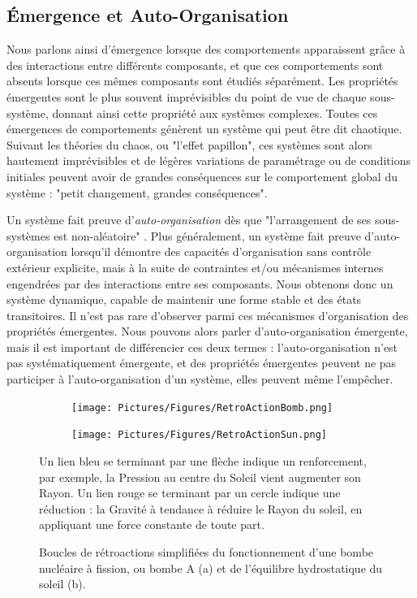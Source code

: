 			\subsection{Émergence et Auto-Organisation}
			
			Nous parlons ainsi d'émergence lorsque des comportements apparaissent grâce à des interactions entre différents composants, et que ces comportements sont absents lorsque ces mêmes composants sont étudiés séparément. Les propriétés émergentes sont le plus souvent imprévisibles du point de vue de chaque sous-système, donnant ainsi cette propriété aux systèmes complexes. Toutes ces émergences de comportements génèrent un système qui peut être dit chaotique. 
			Suivant les théories du chaos, ou "l'effet papillon", ces systèmes sont alors hautement imprévisibles et de légères variations de paramétrage ou de conditions initiales peuvent avoir de grandes conséquences sur le comportement global du système : "petit changement, grandes conséquences".
			
			Un système fait preuve d'\textit{auto-organisation} dès que "l'arrangement de ses sous-systèmes est non-aléatoire" \cite{goos_self-organisation_2003}. Plus généralement, un système fait preuve d'auto-organisation lorsqu'il démontre des capacités d'organisation sans contrôle extérieur explicite, mais à la suite de contraintes et/ou mécanismes internes engendrées par des interactions entre ses composants. Nous obtenons donc un système dynamique, capable de maintenir une forme stable et des états transitoires. Il n'est pas rare d'observer parmi ces mécanismes d'organisation des propriétés émergentes. Nous pouvons alors parler d'auto-organisation émergente, mais il est important de différencier ces deux termes : l'auto-organisation n'est pas systématiquement émergente, et des propriétés émergentes peuvent ne pas participer à l'auto-organisation d'un système, elles peuvent même l'empêcher.
			
			\begin{figure}
			\centering
			\begin{subfigure}{0.45\textwidth}
        		\centering
         		\texttt{[image: Pictures/Figures/RetroActionBomb.png]}
         		\caption{}
         		\label{bomb}
     		\end{subfigure}
     		\hfill
			\begin{subfigure}{0.45\textwidth}
        		\centering
         		\texttt{[image: Pictures/Figures/RetroActionSun.png]}
         		\caption{}
         		\label{sun}
     		\end{subfigure}
			\caption{Boucles de rétroactions simplifiées du fonctionnement d'une bombe nucléaire à fission, ou bombe A (a) et de l'équilibre hydrostatique du soleil (b).}{Un lien bleu se terminant par une flèche indique un renforcement, par exemple, la Pression au centre du Soleil vient augmenter son Rayon. Un lien rouge se terminant par un cercle indique une réduction : la Gravité à tendance à réduire le Rayon du soleil, en appliquant une force constante de toute part.}
			\label{RetroActions}
			\end{figure}
			
